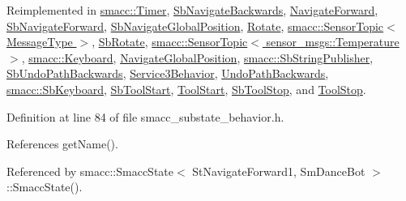 Reimplemented in \hyperlink{classsmacc_1_1Timer_ab99111438ad35cf740ed4bd8c136ff6a}{smacc\+::\+Timer}, \hyperlink{classSbNavigateBackwards_a59b7bc4f0b714f548c73659c87dd405e}{Sb\+Navigate\+Backwards}, \hyperlink{classNavigateForward_a2a1ad66b031773aeac11663020afebba}{Navigate\+Forward}, \hyperlink{classSbNavigateForward_a0e01d850ed0e028f3b9b3704862c7ea5}{Sb\+Navigate\+Forward}, \hyperlink{classSbNavigateGlobalPosition_ae4c1f2e5de1077ee88d506eb69099f0c}{Sb\+Navigate\+Global\+Position}, \hyperlink{classRotate_ab07f79966ab172e454139c4139adf51b}{Rotate}, \hyperlink{classsmacc_1_1SensorTopic_a27fe3515e3981a5a393dea193902cbd0}{smacc\+::\+Sensor\+Topic$<$ Message\+Type $>$}, \hyperlink{classSbRotate_adb33f70659313834da495c294e2eafeb}{Sb\+Rotate}, \hyperlink{classsmacc_1_1SensorTopic_a27fe3515e3981a5a393dea193902cbd0}{smacc\+::\+Sensor\+Topic$<$ sensor\+\_\+msgs\+::\+Temperature $>$}, \hyperlink{classsmacc_1_1Keyboard_afd90aca9ae741a0648e273b70771ac1d}{smacc\+::\+Keyboard}, \hyperlink{classNavigateGlobalPosition_a80962ce5bba51285565e360872f58c47}{Navigate\+Global\+Position}, \hyperlink{classsmacc_1_1SbStringPublisher_adde036f7d11370ec44ed418c2734b60a}{smacc\+::\+Sb\+String\+Publisher}, \hyperlink{classSbUndoPathBackwards_ab7eed4fa4633235b877758bd787bbea1}{Sb\+Undo\+Path\+Backwards}, \hyperlink{classService3Behavior_a914618fa7f8152868204543838cd8359}{Service3\+Behavior}, \hyperlink{classUndoPathBackwards_a073a69a9e7b89d38faaab47096df292c}{Undo\+Path\+Backwards}, \hyperlink{classsmacc_1_1SbKeyboard_ac8a485f7d89b8173ae17d9b190105f21}{smacc\+::\+Sb\+Keyboard}, \hyperlink{classSbToolStart_a1f027da301c03b5114fc241c820dd56a}{Sb\+Tool\+Start}, \hyperlink{classToolStart_a23b54807a3d839a08a6031e67b341a4f}{Tool\+Start}, \hyperlink{classSbToolStop_a411f6a864d2d70be43bdedc0c7ce77ac}{Sb\+Tool\+Stop}, and \hyperlink{classToolStop_a1db01a6b333c6570cbad3495a483d452}{Tool\+Stop}.



Definition at line 84 of file smacc\+\_\+substate\+\_\+behavior.\+h.



References get\+Name().



Referenced by smacc\+::\+Smacc\+State$<$ St\+Navigate\+Forward1, Sm\+Dance\+Bot $>$\+::\+Smacc\+State().




